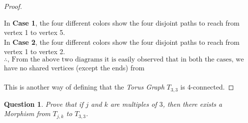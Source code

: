 \documentclass{article}
\newtheorem{question}{Question}
\begin{document}
\begin{proof}
\begin{center}
\end{center}
    In \textbf{Case 1}, the four different colors show the four disjoint paths to reach from vertex 1 to vertex 5.\\
    In \textbf{Case 2}, the four different colors show the four disjoint paths to reach from vertex 1 to vertex 2.\\

    $\therefore \text{, From the above two diagrams it is easily observed that in both the cases, we are able to get four different paths that }$
    have no shared vertices (except the ends) from
    \\
    \\This is another way of defining that the \textit{Torus Graph} $T_{3,3}$ is $4$-connected.
\end{proof}
\begin{question}
   Prove that if $j$ and $k$ are multiples of $3$, then there exists a Morphism from $T_{j,k}$ to $T_{3,3}$.
\end{question}
\end{document}
